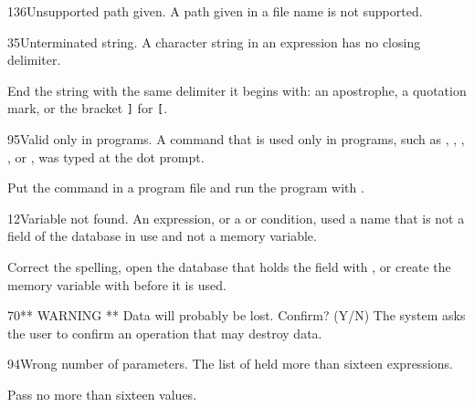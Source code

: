 \begin{XbaseMessageEntry}{136}{Unsupported path given.}
A path given in a file name is not supported.
\end{XbaseMessageEntry}

\begin{XbaseMessageEntry}{35}{Unterminated string.}
A character string in an expression has no closing delimiter.

End the string with the same delimiter it begins with: an apostrophe, a quotation mark, or the bracket \texttt{]} for \texttt{[}.
\end{XbaseMessageEntry}

\begin{XbaseMessageEntry}{95}{Valid only in programs.}
A command that is used only in programs, such as , , , ,  or , was typed at the dot prompt.

Put the command in a program file and run the program with .
\end{XbaseMessageEntry}

\begin{XbaseMessageEntry}{12}{Variable not found.}
An expression, or a  or  condition, used a name that is not a field of the database in use and not a memory variable.

Correct the spelling, open the database that holds the field with , or create the memory variable with  before it is used.
\end{XbaseMessageEntry}

\begin{XbaseMessageEntry}{70}{** WARNING ** Data will probably be lost.  Confirm? (Y/N)}
The system asks the user to confirm an operation that may destroy data.
\end{XbaseMessageEntry}

\begin{XbaseMessageEntry}{94}{Wrong number of parameters.}
The  list of  held more than sixteen expressions.

Pass no more than sixteen values.
\end{XbaseMessageEntry}
